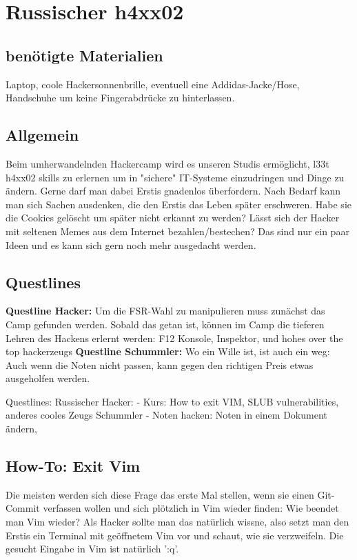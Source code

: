 \section{Russischer h4xx02}
\subsection{benötigte Materialien}
Laptop, coole Hackersonnenbrille, eventuell eine Addidas-Jacke/Hose, Handschuhe um keine Fingerabdrücke zu hinterlassen. 

\subsection{Allgemein}
Beim umherwandelnden Hackercamp wird es unseren Studis ermöglicht, l33t h4xx02 skills zu erlernen um in "sichere" IT-Systeme einzudringen und Dinge zu ändern. Gerne darf man dabei Erstis gnadenlos überfordern.
Nach Bedarf kann man sich Sachen ausdenken, die den Erstis das Leben später erschweren. Habe sie die Cookies gelöscht um später nicht erkannt zu werden? Lässt sich der Hacker mit seltenen Memes aus dem Internet bezahlen/bestechen? Das sind nur ein paar Ideen und es kann sich gern noch mehr ausgedacht werden.

\subsection{Questlines}
\textbf{Questline  Hacker:}
Um die FSR-Wahl zu manipulieren muss zunächst das Camp gefunden werden. Sobald das getan ist, können im Camp die tieferen Lehren des Hackens erlernt werden: F12 Konsole, Inspektor, und hohes over the top hackerzeugs
\newline
\textbf{Questline  Schummler:} Wo ein Wille ist, ist auch ein weg: Auch wenn die Noten nicht passen, kann gegen den richtigen Preis etwas ausgeholfen werden.

Questlines: Russischer Hacker: - Kurs: How to exit VIM, SLUB vulnerabilities, anderes cooles Zeugs
Schummler - Noten hacken: Noten in einem Dokument ändern, 

\subsection{How-To: Exit Vim}
Die meisten werden sich diese Frage das erste Mal stellen, wenn sie einen Git-Commit verfassen wollen und sich plötzlich in Vim wieder finden: Wie beendet man Vim wieder?
Als Hacker sollte man das natürlich wissne, also setzt man den Erstis ein Terminal mit geöffnetem Vim vor und schaut, wie sie verzweifeln. Die gesucht Eingabe in Vim ist natürlich ':q'.

